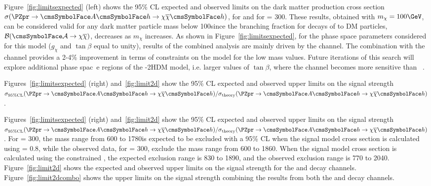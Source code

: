 Figure~\ref{fig:limitsexpected}  (left) shows the 95\% CL expected and observed limits on the dark matter production cross section 
$\sigma(\PZpr \to \Az \Ph \to \chi \overline{\chi} \Ph )$, for \Hbb and \HGG for \maz = 300\GeV. These results, obtained with 
$m_{\chi}= 100\GeV$, can be considered valid for any dark matter particle mass below 100\GeV since the branching fraction for decays of \Az 
to DM particles, $\cal{B}(\Az\to \chi \overline{\chi})$, decreases as $m_{\chi}$ increases.
As shown in Figure~\ref{fig:limitsexpected}, for the phase space parameters considered for this model ($g_{\chi}$ and $\tan{\beta}$ equal 
to unity), results of the combined analysis are mainly driven by the \Hbb channel. The combination with the \HGG channel provides a 
2-4\% improvement in terms of constraints on the model for the low \PZpr mass values. Future iterations of this search will explore 
additional phase spac\
e regions of the \cPZpr-2HDM model, i.e. larger values of $\tan{\beta}$, where the \HGG channel becomes more sensitive than \Hbb~\cite{2HDM}.

Figures~\ref{fig:limitsexpected} (right) and~\ref{fig:limit2d} show the 95\% CL  expected and observed upper limits on the signal strength 
$\sigma_{95\% \mathrm{CL}} (\PZpr \to \Az \Ph \to \chi \overline{\chi} \Ph )/\sigma_\text{theory} (\PZpr \to \Az \Ph \to \chi 
\overline{\chi} \Ph )$.

Figures~\ref{fig:limitsexpected} (right) and~\ref{fig:limit2d} show the 95\% CL  expected and observed upper limits on the signal strength 
$\sigma_{95\% \mathrm{CL}} (\PZpr \to \Az \Ph \to \chi \overline{\chi} \Ph )/\sigma_\text{theory} (\PZpr \to \Az \Ph \to \chi \overline{\chi} \Ph )$.
For \maz = 300\GeV, the \PZpr mass range from 600 to 1780\GeV is expected to be excluded with a 95\% CL when the signal model
cross section is calculated using \gzp = 0.8, while the
observed data, for \maz = 300\GeV, exclude the \zp mass range from 600 to 1860\GeV.
When the signal model cross section is calculated using the constrained \gzp, the expected exclusion range is 830 to 1890\GeV,
and the observed exclusion range is 770 to 2040\GeV.
Figure~\ref{fig:limit2d} shows the expected and observed upper limits on the signal strength for the \Hbb and \HGG decay channels.
Figure~\ref{fig:limit2dcombo} shows the upper limits on the signal strength combining the results from both the \Hbb and \HGG decay channels.

